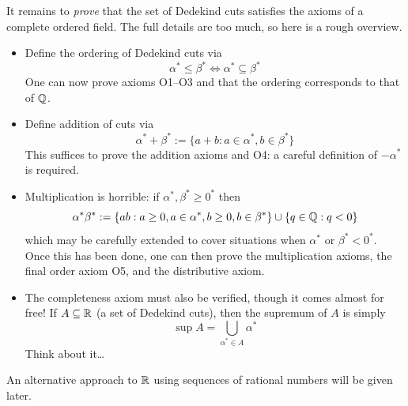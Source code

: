 It remains to \emph{prove} that the set of Dedekind cuts satisfies the axioms of a complete ordered field. The full details are too much, so here is a rough overview.
\begin{itemize}
  \item Define the ordering of Dedekind cuts via
	\[
		\alpha^*\le\beta^*\iff\alpha^*\subseteq\beta^*
	\]
	One can now prove axioms O1--O3 and that the ordering corresponds to that of $\mathbb{Q}$.
	\item Define addition of cuts via
	\[
		\alpha^*+\beta^*:=\{a+b:a\in\alpha^*,b\in\beta^*\}
	\]
	This suffices to prove the addition axioms and O4: a careful definition of $-\alpha^*$ is required.
	\item Multiplication is horrible: if $\alpha^*,\beta^*\ge 0^*$ then
	\[
		\alpha^*\beta^*:=\{ab:a\ge 0,a\in \alpha^*,b\ge 0,b\in \beta^*\}\cup\{q\in\mathbb{Q}:q<0\}
	\]
	which may be carefully extended to cover situations when $\alpha^*$ or $\beta^*<0^*$. Once this has been done, one can then prove the multiplication axioms, the final order axiom O5, and the distributive axiom.
	\item The completeness axiom must also be verified, though it comes almost for free! If $A\subseteq\mathbb{R}$ (a set of Dedekind cuts), then the supremum of $A$ is simply
	\[
		\sup A=\bigcup\limits_{\alpha^*\in A}\alpha^*
	\]
	Think about it\ldots
\end{itemize}

An alternative approach to $\mathbb{R}$ using sequences of rational numbers will be given later.


